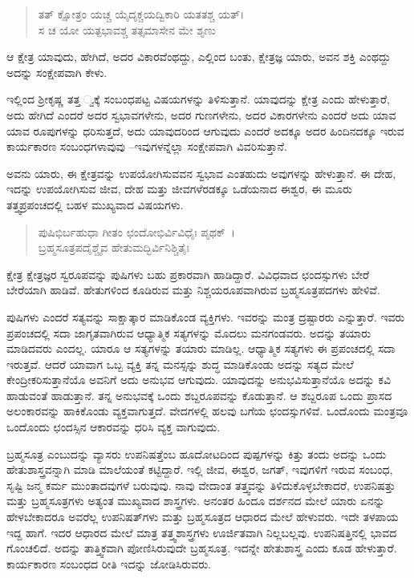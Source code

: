\begin{verse}
ತತ್ ಕ್ಷೋತ್ರಂ ಯಚ್ಚ ಯೈದೃಕ್ಚಯದ್ವಿಕಾರಿ ಯತತಶ್ಚ ಯತ್​।\\ಸ ಚ ಯೋ ಯತ್ಪಭಾವಶ್ಚ ತತ್ಸಮಾಸೇನ ಮೇ ಶೃಣು 
\end{verse}

{\small ಆ ಕ್ಷೇತ್ರ ಯಾವುದು, ಹೇಗಿದೆ, ಅದರ ವಿಕಾರವೆಂಥದ್ದು, ಎಲ್ಲಿಂದ ಬಂತು, ಕ್ಷೇತ್ರಜ್ಞ ಯಾರು, ಅವನ ಶಕ್ತಿ ಎಂಥದ್ದು ಅದನ್ನು ಸಂಕ್ಷೇಪವಾಗಿ ಕೇಳು.}

ಇಲ್ಲಿಂದ ಶ‍್ರೀಕೃಷ್ಣ ತತ್ತ ್ವಕ್ಕೆ ಸಂಬಂಧಪಟ್ಟ ವಿಷಯಗಳನ್ನು ತಿಳಿಸುತ್ತಾನೆ. ಯಾವುದನ್ನು ಕ್ಷೇತ್ರ ಎಂದು ಹೇಳುತ್ತಾರೆ, ಅದು ಹೇಗಿದೆ ಎಂದರೆ ಅದರ ಸ್ವಭಾವಗಳೇನು, ಅದರ ಗುಣಗಳೇನು, ಅದರ ವಿಕಾರಗಳೇನು ಎಂದರೆ ಅದು ಯಾವ ಯಾವ ರೂಪುಗಳನ್ನು ಧರಿಸುತ್ತದೆ, ಅದು ಯಾವುದರಿಂದ ಆಗುವುದು ಎಂದರೆ ಅದಕ್ಕೂ ಅದರ ಹಿಂದಿನದಕ್ಕೂ ಇರುವ ಕಾರ್ಯಕಾರಣ ಸಂಬಂಧಗಳಾವುವು –ಇವುಗಳನ್ನೆಲ್ಲಾ ಸಂಕ್ಷೇಪವಾಗಿ ವಿವರಿಸುತ್ತಾನೆ.

ಅವನು ಯಾರು, ಈ ಕ್ಷೇತ್ರವನ್ನು ಉಪಯೋಗಿಸುವವನ ಸ್ವಭಾವ ಎಂತಹುದು ಅವುಗಳನ್ನು ಹೇಳುತ್ತಾನೆ. ಈ ದೇಹ, ಇದನ್ನು ಉಪಯೋಗಿಸುವ ಜೀವ, ದೇಹ ಮತ್ತು ಜೀವಗಳೆರಡಕ್ಕೂ ಒಡೆಯನಾದ ಈಶ್ವರ, ಈ ಮೂರು ತತ್ತ್ವಪ್ರಪಂಚದಲ್ಲಿ ಬಹಳ ಮುಖ್ಯವಾದ ವಿಷಯಗಳು.

\begin{verse}
ಪುಷಿಭಿರ್ಬಹುಧಾ ಗೀತಂ ಛಂದೋಭಿರ್ವಿವಿಧೈಃ ಪೃಥಕ್~।\\ಬ್ರಹ್ಮಸೂತ್ರಪದೈಶ್ಚೈವ ಹೇತುಮದ್ಭಿರ್ವಿನಿಶ್ಚಿತೈಃ 
\end{verse}

{\small ಕ್ಷೇತ್ರ ಕ್ಷೇತ್ರಜ್ಞರ ಸ್ವರೂಪವನ್ನು ಪುಷಿಗಳು ಬಹು ಪ್ರಕಾರವಾಗಿ ಹಾಡಿದ್ದಾರೆ. ವಿವಿಧವಾದ ಛಂದಸ್ಸುಗಳು ಬೇರೆ ಬೇರೆಯಾಗಿ ಹಾಡಿವೆ. ಹೇತುಗಳಿಂದ ಕೂಡಿರುವ ಮತ್ತು ನಿಶ್ಚಯರೂಪವಾಗಿರುವ ಬ್ರಹ್ಮಸೂತ್ರಪದಗಳು ಹೇಳಿವೆ.}

ಪುಷಿಗಳು ಎಂದರೆ ಸತ್ಯವನ್ನು ಸಾಕ್ಷಾತ್ಕಾರ ಮಾಡಿಕೊಂಡ ವ್ಯಕ್ತಿಗಳು. ಇವರನ್ನು ಮಂತ್ರ ದ್ರಷ್ಟಾರರು ಎನ್ನುತ್ತಾರೆ. ಇವರು ಪ್ರಪಂಚದಲ್ಲಿ ಸದಾ ಜಾಗೃತವಾಗಿರುವ ಆಧ್ಯಾತ್ಮಿಕ ಸತ್ಯಗಳನ್ನು ಮೊದಲು ಮನಗಂಡವರು. ಅದನ್ನು ತಯಾರು ಮಾಡಿದವರು ಎಂದಲ್ಲ. ಯಾರೂ ಆ ಸತ್ಯಗಳನ್ನು ತಯಾರು ಮಾಡಿಲ್ಲ. ಆಧ್ಯಾತ್ಮಿಕ ಸತ್ಯಗಳು ಈ ಪ್ರಪಂಚದಲ್ಲಿ ಸದಾ ಇರುತ್ತವೆ. ಆದರೆ ಯಾವಾಗ ಒಬ್ಬ ವ್ಯಕ್ತಿ ತನ್ನ ಮನಸ್ಸನ್ನು ಶುದ್ಧ ಮಾಡಿಕೊಂಡು ಅದನ್ನು ಸತ್ಯದ ಮೇಲೆ ಕೇಂದ್ರೀಕರಿಸುತ್ತಾನೆಯೊ ಅವನಿಗೆ ಅದು ಅನುಭವ ಆಗುವುದು. ಯಾವುದನ್ನು ಅನುಭವಿಸುತ್ತಾನೆಯೊ ಅದನ್ನು ಕವಿ ಹಾಡುವಂತೆ ಹಾಡುತ್ತಾನೆ. ತನ್ನ ಅನುಭವಕ್ಕೆ ಒಂದು ಶಬ್ದರೂಪವನ್ನು ಕೊಡುತ್ತಾನೆ. ಆ ಶಬ್ದರೂಪ ಒಂದು ಪ್ರಾಸದ ಅಲಂಕಾರವನ್ನು ಹಾಕಿಕೊಂಡು ವ್ಯಕ್ತವಾಗುತ್ತದೆ. ವೇದಗಳಲ್ಲಿ ಹಲವು ಬಗೆಯ ಛಂದಸ್ಸುಗಳಿವೆ. ಒಂದೊಂದು ಮಂತ್ರವೂ ಒಂದೊಂದು ಛಂದಸ್ಸಿನ ಆಕಾರವನ್ನು ಧರಿಸಿ ವ್ಯಕ್ತ ವಾಗುವುದು.

ಬ್ರಹ್ಮಸೂತ್ರ ಎಂಬುದನ್ನು ವ್ಯಾಸರು ಉಪನಿಷತ್ತೆಂಬ ಹೂದೋಟದಿಂದ ಪುಷ್ಪಗಳನ್ನು ಕಿತ್ತು ತಂದು ಅದನ್ನು ಒಂದು ಹೇತುಶಾಸ್ತ್ರವನ್ನಾಗಿ ಮಾಡಿ ಮಾಲೆಯಂತೆ ಕಟ್ಟಿದ್ದಾರೆ. ಇಲ್ಲಿ ಜೀವ, ಈಶ್ವರ, ಜಗತ್, ಇವುಗಳಿಗೆ ಇರುವ ಸಂಬಂಧ, ಸೃಷ್ಟಿ ಜನ್ಮ ಕರ್ಮ ಮುಂತಾದವುಗಳೆ ಬರುವುವು. ನಾವು ವೇದಾಂತ ತತ್ತ್ವವನ್ನು ತಿಳಿದುಕೊಳ್ಳಬೇಕಾದರೆ, ಉಪನಿಷತ್ತು ಮತ್ತು ಬ್ರಹ್ಮಸೂತ್ರಗಳು ಅತ್ಯಂತ ಮುಖ್ಯವಾದ ಶಾಸ್ತ್ರಗಳು. ಅನಂತರ ಹಿಂದೂ ದರ್ಶನದ ಮೇಲೆ ಯಾರು ಏನನ್ನು ಹೇಳಬೇಕಾದರೂ ಅವರೆಲ್ಲ ಉಪನಿಷತ್​ಗಳು ಮತ್ತು ಬ್ರಹ್ಮಸೂತ್ರದ ಆಧಾರದ ಮೇಲೆ ಹೇಳುವರು. ಇದೇ ತಳಪಾಯ ಇದ್ದ ಹಾಗೆ. ಇದರ ಆಧಾರದ ಮೇಲೆ ಮಾತ್ರ ತತ್ತ್ವಶಾಸ್ತ್ರಗಳು ಊರ್ಜಿತವಾಗಿ ನಿಲ್ಲಬಲ್ಲವು. ಉಪನಿಷತ್ತಿನಲ್ಲಿ ಭಾವದ ಗೊಂಚಲಿದೆ. ಅದನ್ನು ತಾತ್ತ್ವಿಕವಾಗಿ ಪೋಣಿಸಿರುವುದೇ ಬ್ರಹ್ಮಸೂತ್ರ. ಇದನ್ನೇ ಹೇತುಶಾಸ್ತ್ರ ಎಂದು ಕೂಡ ಹೇಳುತ್ತಾರೆ. ಕಾರ್ಯಕಾರಣ ಸಂಬಂಧದ ರೀತಿ ಇದನ್ನು ಜೋಡಿಸಿರುವರು.


